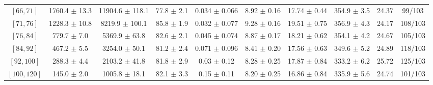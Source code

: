 \begin{tabular}{c||c|c|c|c|c|c|c||c|c}
$[66, 71]$ & 1760.4 $\pm$ 13.3 & 11904.6 $\pm$ 118.1 & 77.8 $\pm$ 2.1 & 0.034 $\pm$ 0.066 & 8.92 $\pm$ 0.16 & 17.74 $\pm$ 0.44 & 354.9 $\pm$ 3.5 & 24.37 & 99/103\\
$[71, 76]$ & 1228.3 $\pm$ 10.8 & 8219.9 $\pm$ 100.1 & 85.8 $\pm$ 1.9 & 0.032 $\pm$ 0.077 & 9.28 $\pm$ 0.16 & 19.51 $\pm$ 0.75 & 356.9 $\pm$ 4.3 & 24.17 & 108/103\\
$[76, 84]$ & 779.7 $\pm$ 7.0 & 5369.9 $\pm$ 63.8 & 82.6 $\pm$ 2.1 & 0.045 $\pm$ 0.074 & 8.87 $\pm$ 0.17 & 18.21 $\pm$ 0.62 & 354.1 $\pm$ 4.2 & 24.67 & 105/103\\
$[84, 92]$ & 467.2 $\pm$ 5.5 & 3254.0 $\pm$ 50.1 & 81.2 $\pm$ 2.4 & 0.071 $\pm$ 0.096 & 8.41 $\pm$ 0.20 & 17.56 $\pm$ 0.63 & 349.6 $\pm$ 5.2 & 24.89 & 118/103\\
$[92, 100]$ & 288.3 $\pm$ 4.4 & 2103.2 $\pm$ 41.8 & 81.8 $\pm$ 2.9 & 0.03 $\pm$ 0.12 & 8.28 $\pm$ 0.25 & 17.87 $\pm$ 0.84 & 333.2 $\pm$ 6.2 & 25.72 & 125/103\\
$[100, 120]$ & 145.0 $\pm$ 2.0 & 1005.8 $\pm$ 18.1 & 82.1 $\pm$ 3.3 & 0.15 $\pm$ 0.11 & 8.20 $\pm$ 0.25 & 16.86 $\pm$ 0.84 & 335.9 $\pm$ 5.6 & 24.74 & 101/103\\
\end{tabular}
